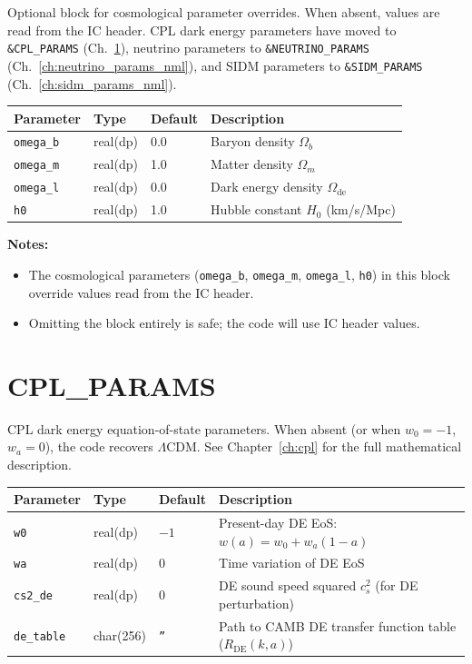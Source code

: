 \documentclass[11pt,fleqn]{book}
\begin{document}
Optional block for cosmological parameter overrides.  When absent,
values are read from the IC header.  CPL dark energy parameters have
moved to \texttt{\&CPL\_PARAMS} (Ch.~\ref{ch:cpl_params_nml}), neutrino
parameters to \texttt{\&NEUTRINO\_PARAMS} (Ch.~\ref{ch:neutrino_params_nml}),
and SIDM parameters to \texttt{\&SIDM\_PARAMS} (Ch.~\ref{ch:sidm_params_nml}).

\begin{longtable}{L{3.5cm} C{1.8cm} C{1.8cm} L{6cm}}
\toprule
\textbf{Parameter} & \textbf{Type} & \textbf{Default} & \textbf{Description} \\
\midrule
\endhead
\texttt{omega\_b} & real(dp) & 0.0 & Baryon density $\Omega_b$ \\
\texttt{omega\_m} & real(dp) & 1.0 & Matter density $\Omega_m$ \\
\texttt{omega\_l} & real(dp) & 0.0 & Dark energy density $\Omega_{\mathrm{de}}$ \\
\texttt{h0} & real(dp) & 1.0 & Hubble constant $H_0$ (km/s/Mpc) \\
\bottomrule
\end{longtable}

\noindent
\textbf{Notes:}
\begin{itemize}[nosep]
  \item The cosmological parameters (\texttt{omega\_b}, \texttt{omega\_m}, \texttt{omega\_l}, \texttt{h0}) in this block override values read from the IC header.
  \item Omitting the block entirely is safe; the code will use IC header values.
\end{itemize}


\chapter{CPL\_PARAMS}
\label{ch:cpl_params_nml}

CPL dark energy equation-of-state parameters.  When absent (or when
$w_0 = -1$, $w_a = 0$), the code recovers $\Lambda$CDM.
See Chapter~\ref{ch:cpl} for the full mathematical description.

\begin{longtable}{L{3.5cm} C{1.8cm} C{1.8cm} L{6cm}}
\toprule
\textbf{Parameter} & \textbf{Type} & \textbf{Default} & \textbf{Description} \\
\midrule
\endhead
\texttt{w0} & real(dp) & $-1$ & Present-day DE EoS: $w(a) = w_0 + w_a(1-a)$ \\
\texttt{wa} & real(dp) & 0 & Time variation of DE EoS \\
\texttt{cs2\_de} & real(dp) & 0 & DE sound speed squared $c_s^2$ (for DE perturbation) \\
\texttt{de\_table} & char(256) & \texttt{''} & Path to CAMB DE transfer function table ($R_{\mathrm{DE}}(k,a)$) \\
\bottomrule
\end{longtable}
\end{document}
